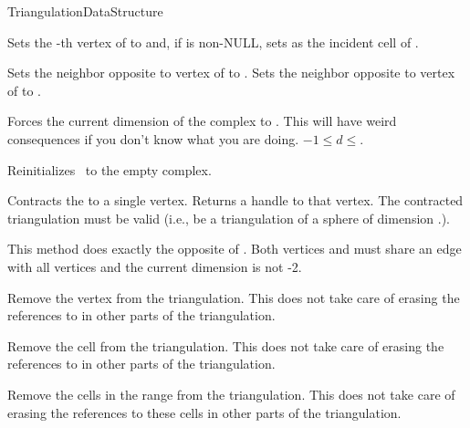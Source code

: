\begin{ccRefConcept}{TriangulationDataStructure}
\begin{ccAdvanced}
{Sets the -th vertex of  to  and, if  is non-NULL,
sets  as the incident cell of .}

{Sets the neighbor opposite to vertex  of   to
. Sets the neighbor opposite to vertex  of 
 to .}

 { Forces the current dimension
of the complex to . This will have weird consequences if you don't know
what you are doing. 
\ccPrecond $-1\leq d\leq$.}

\end{ccAdvanced}


{Reinitializes \ccVar\ to the empty complex.}

 {Contracts the
 to a single vertex. Returns a handle to that vertex. \ccPrecond
The contracted triangulation must be valid ({i.e.}, be a triangulation of
a sphere of dimension \ccVar.).}

 {This method does exactly the opposite of
. \ccPrecond Both vertices  and
 must share an edge with all vertices and the current
dimension is not -2.}

\begin{ccAdvanced}

{Remove the vertex  from the triangulation. This does not take care of
erasing the references to  in other parts of the triangulation.}

{Remove the cell  from the triangulation. This does not take care of
erasing the references to  in other parts of the triangulation.}

{Remove the cells in the range \ccc{[start,end)} from the triangulation.
This does not take care of erasing the references to these cells in other parts of
the triangulation.}


\end{ccAdvanced}
\end{ccRefConcept}
